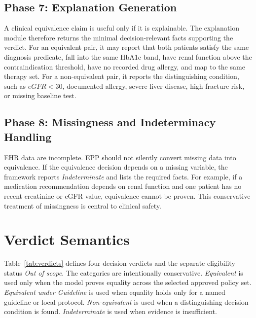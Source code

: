 \documentclass[english,5p,twocolumn,preprint]{elsarticle}
\begin{document}
\subsection{Phase 7: Explanation Generation}
A clinical equivalence claim is useful only if it is explainable. The explanation module therefore returns the minimal decision-relevant facts supporting the verdict. For an equivalent pair, it may report that both patients satisfy the same diagnosis predicate, fall into the same HbA1c band, have renal function above the contraindication threshold, have no recorded drug allergy, and map to the same therapy set. For a non-equivalent pair, it reports the distinguishing condition, such as $eGFR < 30$, documented allergy, severe liver disease, high fracture risk, or missing baseline test.

\subsection{Phase 8: Missingness and Indeterminacy Handling}
EHR data are incomplete. EPP should not silently convert missing data into equivalence. If the equivalence decision depends on a missing variable, the framework reports \emph{Indeterminate} and lists the required facts. For example, if a medication recommendation depends on renal function and one patient has no recent creatinine or eGFR value, equivalence cannot be proven. This conservative treatment of missingness is central to clinical safety.

\section{Verdict Semantics}
Table~\ref{tab:verdicts} defines four decision verdicts and the separate eligibility status \emph{Out of scope}. The categories are intentionally conservative. \emph{Equivalent} is used only when the model proves equality across the selected approved policy set. \emph{Equivalent under Guideline} is used when equality holds only for a named guideline or local protocol. \emph{Non-equivalent} is used when a distinguishing decision condition is found. \emph{Indeterminate} is used when evidence is insufficient.
\end{document}
